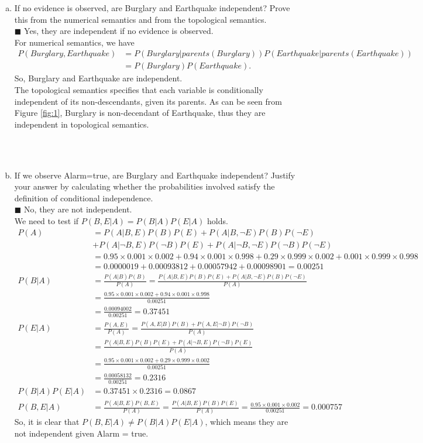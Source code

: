 \documentclass{article}
\newcommand{\solution}[1]{~\\ $\blacksquare$ \sffamily\upshape\selectfont #1
\normalfont ~\\~ }
\begin{document}
\begin{enumerate}[a.]
\item If no evidence is observed, are Burglary and Earthquake
  independent? Prove this from the numerical semantics and from the
  topological semantics.
  \solution{Yes, they are independent if no evidence is observed. \\ 
    For numerical semantics, we have 
    \begin{align*}
      P(Burglary, Earthquake) & =
      P(Burglary|parents(Burglary))P(Earthquake|parents(Earthquake))  \\
  & = P(Burglary)P(Earthquake). 
\end{align*}
So, Burglary and Earthquake are independent. \\
The topological semantics specifies that each variable is
conditionally independent of its non-descendants, given its
parents. As can be seen from Figure \ref{fig:1}, Burglary is
non-decendant of Earthquake, thus they are independent in
topological semantics. 
}
\item If we observe Alarm=true, are Burglary and Earthquake
independent? Justify your answer by calculating whether the
probabilities involved satisfy the definition of conditional
independence.
\solution{No, they are not independent. \\
We need to test if $P(B,E|A) = P(B|A)P(E|A)$ holds. 
\begin{align*}
P(A) & = P(A|B,E)P(B)P(E) + P(A|B,\neg E)P(B)P(\neg E) \\ 
& + P(A|\neg B,E)P(\neg B)P(E) + P(A|\neg B,\neg E)P(\neg B)P(\neg E) \\ 
& = 0.95\times 0.001\times 0.002 + 0.94\times 0.001\times 0.998 +
0.29\times 0.999\times 0.002 + 0.001\times 0.999 \times 0.998 \\ 
& = 0.0000019 + 0.00093812 + 0.00057942 + 0.00098901 = 0.00251 \\
P(B|A) & = \frac{P(A|B)P(B)}{P(A)} 
= \frac{P(A|B,E)P(B)P(E)+P(A|B,\neg E)P(B)P(\neg E)}{P(A)} \\
& = \frac{0.95\times 0.001\times 0.002 + 0.94\times 0.001\times
  0.998}{0.00251}\\ 
& = \frac{0.00094002}{0.00251} = 0.37451 \\
P(E|A) & = \frac{P(A,E)}{P(A)}
 = \frac{P(A,E|B)P(B)+P(A,E|\neg B)P(\neg B)}{P(A)} \\
& = \frac{P(A|B,E)P(B)P(E)+P(A|\neg B,E)P(\neg B)P(E)}{P(A)} \\
& = \frac{0.95\times 0.001\times 0.002 + 0.29\times 0.999\times
  0.002}{0.00251} \\ 
& = \frac{0.00058132}{0.00251} = 0.2316 \\
P(B|A)P(E|A) & = 0.37451 \times 0.2316 = 0.0867 \\
P(B,E|A) & = \frac{P(A|B,E)P(B,E)}{P(A)}
 = \frac{P(A|B,E)P(B)P(E)}{P(A)} = \frac{0.95\times 0.001\times 0.002}{0.00251} = 0.000757 
\end{align*}
So, it is clear that $P(B,E|A)\neq P(B|A)P(E|A)$, which means they are
not independent given Alarm = true. 
}
\end{enumerate}
\end{document}
